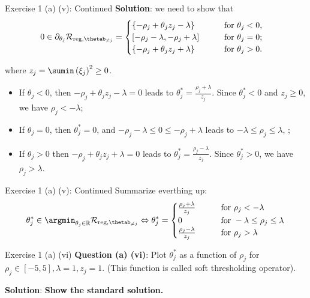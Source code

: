 \documentclass[aspectratio=169]{beamer}
\newcommand{\xij}{\xi_j}
\begin{document}
\begin{frame}{Exercise 1 (a) (v): Continued}
	\small
	\textbf{Solution}: we need to show that 
	\begin{align*}
		0 \in \partial_{\theta_j} \mathcal{R}_{\text{reg}, \thetab_{\neq j}} &= \begin{cases}
				\{ -\rho_j + \theta_j z_j - \lambda \} \qquad & \text{for } \theta_j < 0, \\
				[-\rho_j -\lambda, -\rho_j + \lambda ] \qquad & \text{for } \theta_j = 0; \\
				\{- \rho_j + \theta_j z_j + \lambda  \} \qquad & \text{for } \theta_j > 0. 
		\end{cases}
	\end{align*}
		
	where $z_j = \sumin \left( \xij \right)^2 \geq 0$.
	\begin{itemize}
		\item<2-> If $\theta_j < 0$, then $-\rho_j + \theta_j z_j - \lambda = 0$ leads to $\theta_j^* = \frac{\rho_j + \lambda}{z_j}$. Since $\theta_j^* <0$ and $z_j \geq 0$, we have $\rho_j < -\lambda$;
		\item<3-> If $\theta_j = 0$, then $\theta_j^* = 0$, and $-\rho_j - \lambda \leq 0 \leq -\rho_j + \lambda$ leads to $-\lambda \leq \rho_j \leq \lambda$, ;
		\item<4-> If $\theta_j > 0$ then $-\rho_j + \theta_j z_j + \lambda = 0$ leads to $\theta_j^* = \frac{\rho_j - \lambda}{z_j}$. Since $\theta_j^* > 0$, we have $\rho_j > \lambda$.
	\end{itemize}
	
\end{frame}

\begin{frame}{Exercise 1 (a) (v): Continued}
	Summarize everthing up:
	$$\theta_j^* \in \argmin_{\theta_j \in \mathbb{R}} \mathcal{R}_{\text{reg}, \thetab_{\neq j}} \Leftrightarrow \theta_j^* = 
		\begin{cases}
			\frac{\rho_j + \lambda}{z_j} \qquad & \text{for } \rho_j < - \lambda \\
			0 \qquad & \text{for } - \lambda \leq \rho_j \leq \lambda \\
			\frac{\rho_j - \lambda}{z_j} \qquad & \text{for } \rho_j > \lambda  
		\end{cases}
	$$
\end{frame}

\begin{frame}{Exercise 1 (a) (vi)}
	\textbf{Question (a) (vi)}: Plot $\theta_j^*$ as a function of $\rho_j$ for $\rho_j \in [-5, 5], \lambda =1, z_j = 1$. (This function is called soft thresholding operator).
	\vspace{10pt}
	
	\textbf{Solution}: \textbf{Show the standard solution.}
\end{frame}
\end{document}
